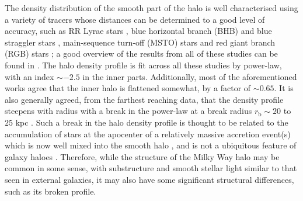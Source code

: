 The density distribution of the smooth part of the halo is well characterised using a variety of tracers whose distances can be determined to a good level of accuracy, such as RR Lyrae stars 
\citep[e.g.][]{2009MNRAS.398.1757W,2010ApJ...708..717S,2013AJ....146...21S,2014ApJ...788..105F}, blue horizontal branch (BHB) and blue straggler stars \citep[e.g.][]{2011MNRAS.416.2903D}, main-sequence turn-off (MSTO) stars \citep[e.g.][]{2011ApJ...731....4S} and red giant branch (RGB) stars \citep[e.g.][]{2015ApJ...809..144X}; a good overview of the results from all of these studies can be found in \citet{2016ARA&A..54..529B}. The halo density profile is fit across all these studies by power-law, with an index $\sim-2.5$ in the inner parts. Additionally, most of the aforementioned works agree that the inner halo is flattened somewhat, by a factor of $\sim 0.65$. It is also generally agreed, from the farthest reaching data, that the density profile steepens with radius with a break in the power-law at a break radius $r_{\mathrm{b}}\sim 20$ to $25$ kpc \citep[e.g.][]{2009MNRAS.398.1757W,2011ApJ...731....4S,2011MNRAS.416.2903D}. Such a break in the halo density profile is thought to be related to the accumulation of stars at the apocenter of a relatively massive accretion event(s) which is now well mixed into the smooth halo \citep{2013ApJ...763..113D}, and is not a ubiquitous feature of galaxy haloes \citep[a good example being the lack of such a break in M31, e.g.][]{2011ApJ...739...20C}. Therefore, while the structure of the Milky Way halo may be common in some sense, with substructure and smooth stellar light similar to that seen in external galaxies, it may also have some significant structural differences, such as its broken profile. 

